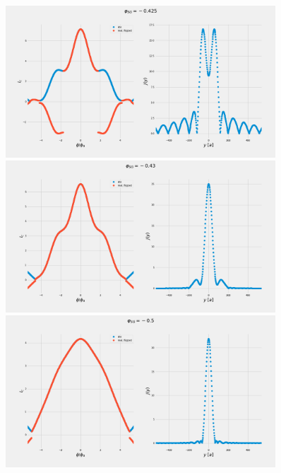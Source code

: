 \documentclass[a4paper]{article}
\begin{document}
\begin{figure}
	\includegraphics[width=0.9\textwidth]{figs/wg32double/current_and_density_0425}
	\includegraphics[width=0.9\textwidth]{figs/wg32double/current_and_density_043}
	\includegraphics[width=0.9\textwidth]{figs/wg32double/current_and_density_05}
\end{figure}
\end{document}

